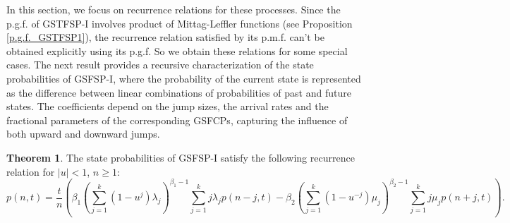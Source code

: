 \documentclass[11pt,oneside,reqno]{amsart}
\theoremstyle{definition}
\newtheorem{theorem}{\bf Theorem}[section]
\theoremstyle{remarkstyle}
\begin{document}
In this section, we focus on recurrence relations for these processes. Since the p.g.f. of GSTFSP-I involves product of Mittag-Leffler functions (see Proposition \ref{p.g.f._GSTFSP1}), the recurrence relation satisfied by its p.m.f. can't be obtained explicitly using its p.g.f. So we obtain these relations for some special cases. The next result provides a recursive characterization of the state probabilities of GSFSP-I, where the probability of the current state is represented as the difference between linear combinations of probabilities of past and future states. The coefficients depend on the jump sizes, the arrival rates and the fractional parameters of the corresponding GSFCPs, capturing the influence of both upward and downward jumps. 
\begin{theorem}\label{recurrence.GSFSP}
    The state probabilities of GSFSP-I satisfy the following recurrence relation for $|u|<1$, $n\geq 1$:
\begin{equation*}
    p(n,t)=\frac{t}{n}(\beta_1(\sum_{j=1}^{k}(1-u^j)\lambda_j)^{\beta_1-1}\sum_{j=1}^{k}j\lambda_jp(n-j,t)-\beta_2(\sum_{j=1}^{k}(1-u^{-j})\mu_j)^{\beta_2-1}\sum_{j=1}^{k}j\mu_jp(n+j,t)).
\end{equation*}
\end{theorem}
\end{document}
